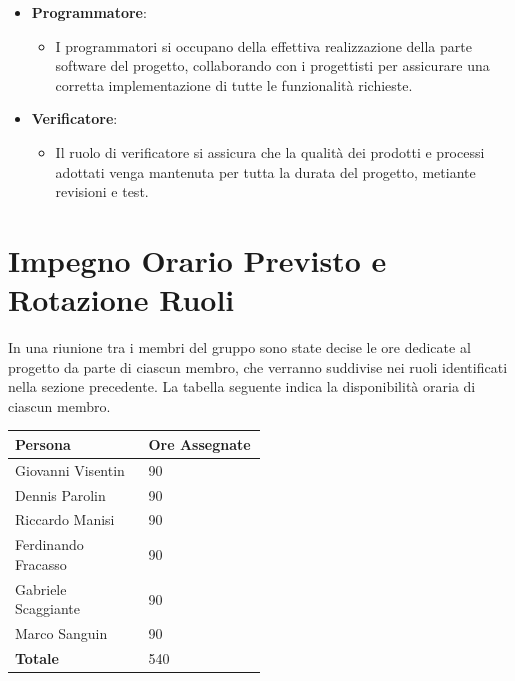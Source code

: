 \documentclass[a4paper,12pt]{article}
\begin{document}
\begin{itemize}
    \item \textbf{Programmatore}:
        \begin{itemize}
            \item I programmatori si occupano della effettiva realizzazione della parte software del progetto, collaborando con i progettisti per assicurare una corretta implementazione di tutte le funzionalità richieste.
        \end{itemize}

    \item \textbf{Verificatore}:
        \begin{itemize}
            \item Il ruolo di verificatore si assicura che la qualità dei prodotti e processi adottati venga mantenuta per tutta la durata del progetto, metiante revisioni e test.
        \end{itemize}
\end{itemize}

\section{Impegno Orario Previsto e Rotazione Ruoli}
In una riunione tra i membri del gruppo sono state decise le ore dedicate al progetto da parte di ciascun membro, che verranno suddivise nei ruoli identificati nella sezione precedente.
La tabella seguente indica la disponibilità oraria di ciascun membro.
\begin{center}
    \small
    \renewcommand{\arraystretch}{1.2} 
    \begin{tabular}{|p{0.30\linewidth}|p{0.20\linewidth}|}
        \hline
        \rowcolor{gray!60} 
        \textbf{Persona} & \textbf{Ore Assegnate}\\
        \hline
        \rowcolor{white}
        Giovanni Visentin & 90 \\
        \hline
        \rowcolor{gray!20}
        Dennis Parolin & 90 \\
        \hline
        \rowcolor{white}
        Riccardo Manisi	& 90 \\
        \hline
        \rowcolor{gray!20}
        Ferdinando Fracasso & 90 \\
        \hline
        \rowcolor{white}
        Gabriele Scaggiante & 90 \\
        \hline
        \rowcolor{gray!20}
        Marco Sanguin & 90 \\
        \hline
        \rowcolor{gray!60}
        \textbf{Totale} & 540 \\
        \hline
    \end{tabular}
\end{center}
    
\end{document}
